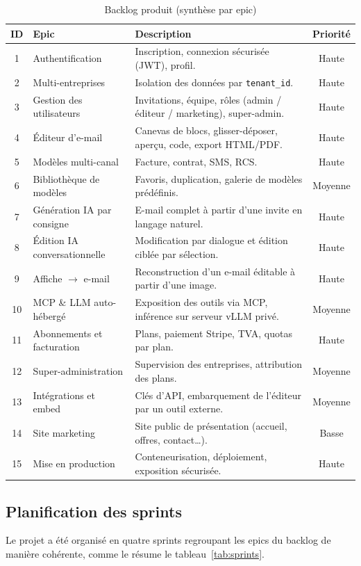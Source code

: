 \begin{table}[H]
\centering
\caption{Backlog produit (synthèse par epic)}
\label{tab:backlog}
\small
\begin{tabularx}{\linewidth}{clXc}
\toprule
\textbf{ID} & \textbf{Epic} & \textbf{Description} & \textbf{Priorité} \\
\midrule
1  & Authentification & Inscription, connexion sécurisée (JWT), profil. & Haute \\
2  & Multi-entreprises & Isolation des données par \texttt{tenant\_id}. & Haute \\
3  & Gestion des utilisateurs & Invitations, équipe, rôles (admin / éditeur / marketing), super-admin. & Haute \\
4  & Éditeur d'e-mail & Canevas de blocs, glisser-déposer, aperçu, code, export HTML/PDF. & Haute \\
5  & Modèles multi-canal & Facture, contrat, SMS, RCS. & Haute \\
6  & Bibliothèque de modèles & Favoris, duplication, galerie de modèles prédéfinis. & Moyenne \\
7  & Génération IA par consigne & E-mail complet à partir d'une invite en langage naturel. & Haute \\
8  & Édition IA conversationnelle & Modification par dialogue et édition ciblée par sélection. & Haute \\
9  & Affiche $\rightarrow$ e-mail & Reconstruction d'un e-mail éditable à partir d'une image. & Haute \\
10 & MCP \& LLM auto-hébergé & Exposition des outils via MCP, inférence sur serveur vLLM privé. & Moyenne \\
11 & Abonnements et facturation & Plans, paiement Stripe, TVA, quotas par plan. & Haute \\
12 & Super-administration & Supervision des entreprises, attribution des plans. & Moyenne \\
13 & Intégrations et embed & Clés d'API, embarquement de l'éditeur par un outil externe. & Moyenne \\
14 & Site marketing & Site public de présentation (accueil, offres, contact\dots). & Basse \\
15 & Mise en production & Conteneurisation, déploiement, exposition sécurisée. & Haute \\
\bottomrule
\end{tabularx}
\end{table}

\subsection{Planification des sprints}
Le projet a été organisé en quatre sprints regroupant les epics du backlog
de manière cohérente, comme le résume le tableau~\ref{tab:sprints}.

